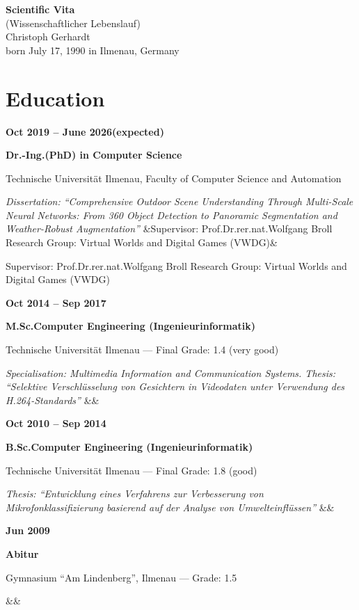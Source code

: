 \documentclass[11pt,a4paper]{article}
\newcommand{\cventryFull}[5]{%
  \par\noindent
  \begin{minipage}[t]{3.5cm}\raggedright\textbf{#1}\end{minipage}%
  \hfill
  \begin{minipage}[t]{\dimexpr\textwidth-3.8cm\relax}%
    \textbf{#2}\par #3\par\textit{#4}%
    \ifx&#5&\else\par #5\fi
  \end{minipage}%
  \par\vspace{8pt}%
}
\begin{document}
\begin{center}
  {\LARGE\bfseries\color{tuilmenaugruen} Scientific Vita}\\[0.3em]
  {\large\color{tuilmenaugruen} (Wissenschaftlicher Lebenslauf)}\\[0.8em]
  {\large Christoph Gerhardt}\\[0.3em]
  {\normalsize born July 17, 1990 in Ilmenau, Germany}\\[1.5em]
\end{center}

\section*{Education}

\cventryFull{Oct 2019 -- June 2026\newline(expected)}
  {Dr.-Ing.\@ (PhD) in Computer Science}
  {Technische Universit\"at Ilmenau, Faculty of Computer Science and Automation}
  {Dissertation: ``Comprehensive Outdoor Scene Understanding Through Multi-Scale
   Neural Networks: From 360\textdegree{} Object Detection to Panoramic
   Segmentation and Weather-Robust Augmentation''}
  {Supervisor: Prof.\@ Dr.\@ rer.\@ nat.\@ Wolfgang Broll\newline
   Research Group: Virtual Worlds and Digital Games (VWDG)}

\cventryFull{Oct 2014 -- Sep 2017}
  {M.Sc.\@ Computer Engineering (Ingenieurinformatik)}
  {Technische Universit\"at Ilmenau --- Final Grade: 1.4 (very good)}
  {Specialisation: Multimedia Information and Communication Systems.\newline
   Thesis: ``Selektive Verschl\"usselung von Gesichtern in Videodaten
   unter Verwendung des H.264-Standards''}
  {}

\cventryFull{Oct 2010 -- Sep 2014}
  {B.Sc.\@ Computer Engineering (Ingenieurinformatik)}
  {Technische Universit\"at Ilmenau --- Final Grade: 1.8 (good)}
  {Thesis: ``Entwicklung eines Verfahrens zur Verbesserung von
   Mikrofonklassifizierung basierend auf der Analyse von Umwelteinfl\"ussen''}
  {}

\cventryFull{Jun 2009}
  {Abitur}
  {Gymnasium ``Am Lindenberg'', Ilmenau --- Grade: 1.5}
  {}
  {}

\end{document}

